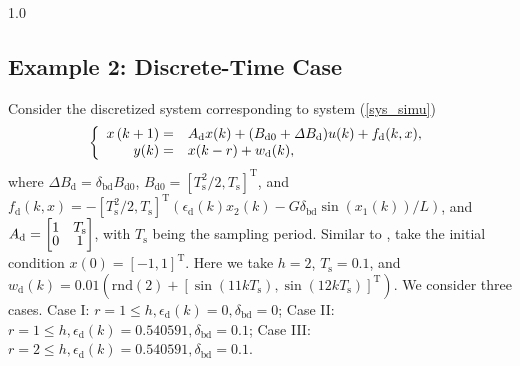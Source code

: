 \documentclass[journal]{IEEEtran}
\begin{document}
\begin{spacing}{1.0}
\subsection{Example 2: Discrete-Time Case}

Consider the discretized system corresponding to system (\ref{sys_simu})
\begin{equation}
\left\{
\begin{array}
[c]{rl}%
x\left(  k+1\right)  = & A_{\mathrm{d}}x(k)  +(B_{\mathrm{d}%
0}+\mathit{\Delta}B_{\mathrm{d}})u(  k)  +f_{\mathrm{d}}(k,x),\\
y(k)= & x(k-r)+w_{\mathrm{d}}(k),
\end{array}
\right.  \label{x_ky}%
\end{equation}
where $\mathit{\Delta}B_{\mathrm{d}}=\delta_{\mathrm{bd}}B_{\mathrm{d}0}$,
$B_{\mathrm{d}0}=[T_{\mathrm{s}}^{2}/2,T_{\mathrm{s}}]^{\mathrm{T}}$, and
$f_{\mathrm{d}}(k,x)=-
[T_{\mathrm{s}}^{2}/2,T_{\mathrm{s}}]^{\mathrm{T}}
(\epsilon_{\mathrm{d}}(k)x_{2}(k)
-G\delta_{\mathrm{bd}}\sin(x_{1}(k))/L)$, and
$A_{\mathrm{d}}=\left[
\begin{array}{@{}cc@{}}
1&T_{\mathrm{s}}\\[-0.8mm]
0&1
\end{array}
\right]$,
with $T_{\mathrm{s}}$ being the sampling period. Similar to \cite{Mazenc25tac}%
, take the initial condition $x(0)=[-1,1]^{\mathrm{T}}$.
Here we take $h=2$, $T_{\mathrm{s}}=0.1$, and $w_{\mathrm{d}}%
(k)=0.01(\mathrm{rnd}(2)+[\sin(11kT_{\mathrm{s}}),\sin(12kT_{\mathrm{s}%
})]^{\mathrm{T}})$. We consider three cases. Case I:
$r=1\leq h,\epsilon_{\mathrm{d}}(k)=0,\delta_{\mathrm{bd}}=0$; Case II:
$r=1\leq h,\epsilon_{\mathrm{d}}(k)=0.540591,\delta_{\mathrm{bd}}=0.1$;
Case III:
$r=2\leq h,\epsilon_{\mathrm{d}}(k)=0.540591,\delta_{\mathrm{bd}}=0.1$.


\end{spacing}
\end{document}
